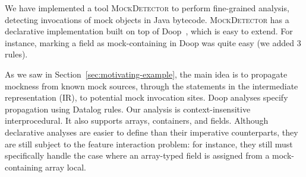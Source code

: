 \label{sec:methodology}

We have implemented a tool \textsc{MockDetector} to perform fine-grained analysis, detecting invocations of mock objects in Java bytecode. \textsc{MockDetector} has a declarative implementation built on top of Doop~\cite{bravenboer09:_stric_declar_specif_sophis_point_analy}, which is easy to extend. For instance, marking a field as mock-containing in Doop was quite easy (we added 3 rules).

As we saw in Section~\ref{sec:motivating-example}, the main idea is to propagate mockness from known mock sources, through the statements in the intermediate representation (IR), to potential mock invocation sites. Doop analyses specify propagation using Datalog rules. 
Our analysis is context-insensitive interprocedural.
It also supports arrays, containers, and fields. Although declarative analyses are easier to define than their imperative counterparts, they are still subject to the feature interaction problem: for instance, they still must specifically handle the case where an array-typed field is assigned from a mock-containing array local.

